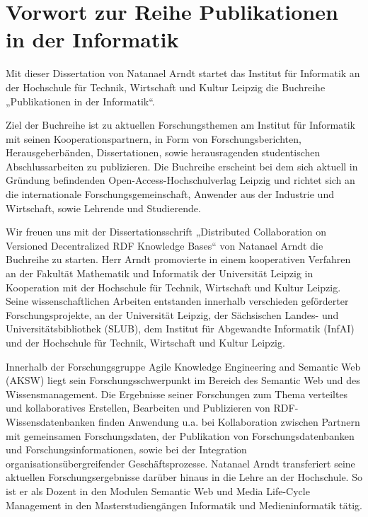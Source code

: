 
\section*{Vorwort zur Reihe Publikationen in der Informatik}

Mit dieser Dissertation von Natanael Arndt startet das Institut für Informatik an der Hochschule für Technik, Wirtschaft und Kultur Leipzig die Buchreihe „Publikationen in der Informatik“.

Ziel der Buchreihe ist zu aktuellen Forschungsthemen am Institut für Informatik mit seinen Kooperationspartnern, in Form von Forschungsberichten, Herausgeberbänden, Dissertationen, sowie herausragenden studentischen Abschlussarbeiten zu publizieren. Die Buchreihe erscheint bei dem sich aktuell in Gründung befindenden Open-Access-Hochschulverlag Leipzig und richtet sich an die internationale Forschungsgemeinschaft, Anwender aus der Industrie und Wirtschaft, sowie Lehrende und Studierende.

Wir freuen uns mit der Dissertationsschrift „Distributed Collaboration on Versioned Decentralized RDF Knowledge Bases“ von Natanael Arndt die Buchreihe zu starten. Herr Arndt promovierte in einem kooperativen Verfahren an der Fakultät Mathematik und Informatik der Universität Leipzig in Kooperation mit der Hochschule für Technik, Wirtschaft und Kultur Leipzig. Seine wissenschaftlichen Arbeiten entstanden innerhalb verschieden geförderter Forschungsprojekte, an der Universität Leipzig, der Sächsischen Landes- und Universitätsbibliothek (SLUB), dem Institut für Abgewandte Informatik (InfAI) und der Hochschule für Technik, Wirtschaft und Kultur Leipzig.

Innerhalb der Forschungsgruppe Agile Knowledge Engineering and Semantic Web (AKSW) liegt sein Forschungsschwerpunkt im Bereich des Semantic Web und des Wissensmanagement. Die Ergebnisse seiner Forschungen zum Thema verteiltes und kollaboratives Erstellen, Bearbeiten und Publizieren von RDF-Wissensdatenbanken finden Anwendung u.a. bei Kollaboration zwischen Partnern mit gemeinsamen Forschungsdaten, der Publikation von Forschungsdatenbanken und Forschungsinformationen, sowie bei der Integration organisationsübergreifender Geschäftsprozesse.
Natanael Arndt transferiert seine aktuellen Forschungsergebnisse darüber hinaus in die Lehre an der Hochschule. So ist er als Dozent in den Modulen Semantic Web und Media Life-Cycle Management in den Masterstudiengängen Informatik und Medieninformatik tätig.
\vspace{1cm}

